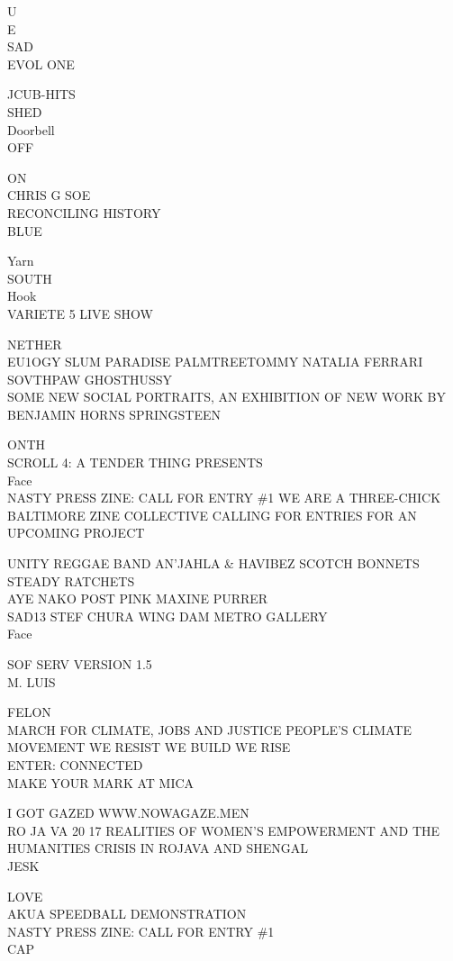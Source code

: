 \documentclass[10pt,letterpaper]{article}
\begin{document}
U\\
E\\
SAD\\
EVOL ONE

JCUB{-}HITS\\
SHED\\
Doorbell\\
OFF

ON\\
CHRIS G SOE\\
RECONCILING HISTORY\\
BLUE

Yarn\\
SOUTH\\
Hook\\
VARIETE 5 LIVE SHOW

NETHER\\
EU1OGY SLUM PARADISE PALMTREETOMMY NATALIA FERRARI SOVTHPAW GHOSTHUSSY\\
SOME NEW SOCIAL PORTRAITS, AN EXHIBITION OF NEW WORK BY BENJAMIN HORNS SPRINGSTEEN

ONTH\\
SCROLL 4: A TENDER THING PRESENTS\\
Face\\
NASTY PRESS ZINE: CALL FOR ENTRY \#1 WE ARE A THREE{-}CHICK BALTIMORE ZINE COLLECTIVE CALLING FOR ENTRIES FOR AN UPCOMING PROJECT

UNITY REGGAE BAND AN'JAHLA \& HAVIBEZ SCOTCH BONNETS STEADY RATCHETS\\
AYE NAKO POST PINK MAXINE PURRER\\
SAD13 STEF CHURA WING DAM METRO GALLERY\\
Face

SOF SERV VERSION 1.5\\
M. LUIS

FELON\\
MARCH FOR CLIMATE, JOBS AND JUSTICE PEOPLE'S CLIMATE MOVEMENT WE RESIST WE BUILD WE RISE\\
ENTER: CONNECTED\\
MAKE YOUR MARK AT MICA

I GOT GAZED WWW.NOWAGAZE.MEN\\
RO JA VA 20 17 REALITIES OF WOMEN'S EMPOWERMENT AND THE HUMANITIES CRISIS IN ROJAVA AND SHENGAL\\
JESK

LOVE\\
AKUA SPEEDBALL DEMONSTRATION\\
NASTY PRESS ZINE: CALL FOR ENTRY \#1\\
CAP
\end{document}
